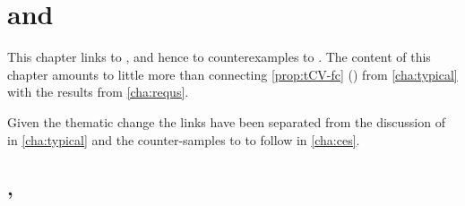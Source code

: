\chapter{ and }
\label{sec:typicalRequs}


\begin{note}
  This chapter links \tC{} to , and hence \tC{} to counterexamples to \issueInclusion{}.
  The content of this chapter amounts to little more than connecting \autoref{prop:tCV-fc} () from \autoref{cha:typical} with the results from \autoref{cha:requs}.

  Given the thematic change the links have been separated from the discussion of \tCV{} in \autoref{cha:typical} and the counter-samples to \issueInclusion{} to follow in \autoref{cha:ces}.
\end{note}



\section{, }
\label{sec:tc2-requ1}


